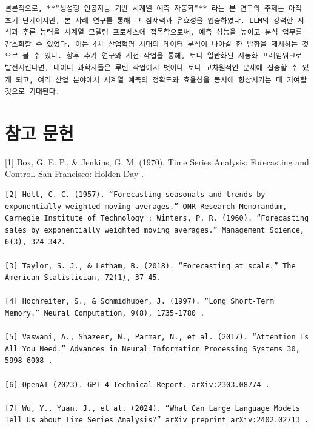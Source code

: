 \documentclass[12pt,ko,a4,]{report}
\begin{document}
\begin{lstlisting}
결론적으로, **"생성형 인공지능 기반 시계열 예측 자동화"** 라는 본 연구의 주제는 아직 초기 단계이지만, 본 사례 연구를 통해 그 잠재력과 유효성을 입증하였다. LLM의 강력한 지식과 추론 능력을 시계열 모델링 프로세스에 접목함으로써, 예측 성능을 높이고 분석 업무를 간소화할 수 있었다. 이는 4차 산업혁명 시대의 데이터 분석이 나아갈 한 방향을 제시하는 것으로 볼 수 있다. 향후 추가 연구와 개선 작업을 통해, 보다 일반화된 자동화 프레임워크로 발전시킨다면, 데이터 과학자들은 루틴 작업에서 벗어나 보다 고차원적인 문제에 집중할 수 있게 되고, 여러 산업 분야에서 시계열 예측의 정확도와 효율성을 동시에 향상시키는 데 기여할 것으로 기대된다.
\end{lstlisting}

\chapter*{참고 문헌}

{[}1{]} Box, G. E. P., \& Jenkins, G. M. (1970). Time Series Analysis:
Forecasting and Control. San Francisco: Holden-Day .

\begin{lstlisting}
[2] Holt, C. C. (1957). “Forecasting seasonals and trends by exponentially weighted moving averages.” ONR Research Memorandum, Carnegie Institute of Technology ; Winters, P. R. (1960). “Forecasting sales by exponentially weighted moving averages.” Management Science, 6(3), 324-342.

[3] Taylor, S. J., & Letham, B. (2018). “Forecasting at scale.” The American Statistician, 72(1), 37-45.

[4] Hochreiter, S., & Schmidhuber, J. (1997). “Long Short-Term Memory.” Neural Computation, 9(8), 1735-1780 .

[5] Vaswani, A., Shazeer, N., Parmar, N., et al. (2017). “Attention Is All You Need.” Advances in Neural Information Processing Systems 30, 5998-6008 .

[6] OpenAI (2023). GPT-4 Technical Report. arXiv:2303.08774 .

[7] Wu, Y., Yuan, J., et al. (2024). “What Can Large Language Models Tell Us about Time Series Analysis?” arXiv preprint arXiv:2402.02713 .
\end{lstlisting}
\end{document}
